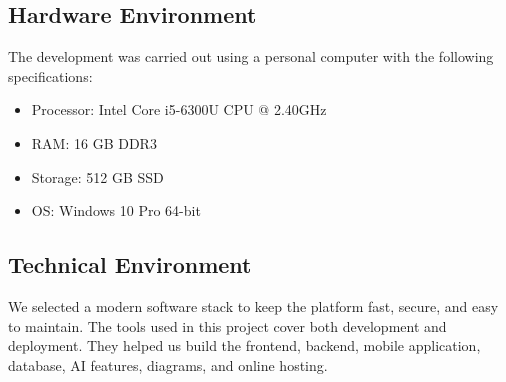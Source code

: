 \documentclass[12pt,a4paper]{report}
\begin{document}
\subsection{Hardware Environment}

The development was carried out using a personal computer with the following specifications:

\begin{itemize}
    \item Processor: Intel Core i5-6300U CPU @ 2.40GHz
    \item RAM: 16 GB DDR3
    \item Storage: 512 GB SSD
    \item OS: Windows 10 Pro 64-bit
\end{itemize}

\subsection{Technical Environment}

We selected a modern software stack to keep the platform fast, secure, and easy to maintain.
The tools used in this project cover both development and deployment. They helped us build the frontend, backend, mobile application, database, AI features, diagrams, and online hosting.
\end{document}
